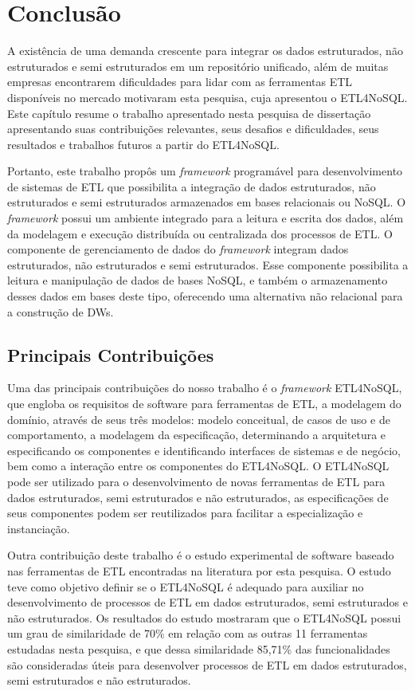 \chapter{Conclusão}


A existência de uma demanda crescente para integrar os dados estruturados, não estruturados e semi estruturados em um repositório unificado, além de muitas empresas encontrarem dificuldades para lidar com as ferramentas ETL disponíveis no mercado motivaram esta pesquisa, cuja apresentou o ETL4NoSQL. Este capítulo resume o trabalho apresentado nesta pesquisa de dissertação apresentando suas contribuições relevantes, seus desafios e dificuldades, seus resultados e trabalhos futuros a partir do ETL4NoSQL. 


Portanto, este trabalho propôs um \textit{framework} programável para desenvolvimento de sistemas de ETL que possibilita a integração de dados estruturados, não estruturados e semi estruturados armazenados em bases relacionais ou NoSQL. O \textit{framework} possui um ambiente integrado para a leitura e escrita dos dados, além da modelagem e execução distribuída ou centralizada dos processos de ETL. O componente de gerenciamento de dados do \textit{framework} integram dados estruturados, não estruturados e semi estruturados. Esse componente possibilita a leitura e manipulação de dados de bases NoSQL, e também o armazenamento desses dados em bases deste tipo, oferecendo uma alternativa não relacional para a construção de DWs.

\clearpage

\section{Principais Contribuições}

Uma das principais contribuições do nosso trabalho é o \textit{framework} ETL4NoSQL, que engloba os requisitos de software para ferramentas de ETL, a modelagem do domínio, através de seus três modelos: modelo conceitual, de casos de uso e de comportamento, a modelagem da especificação, determinando a arquitetura e especificando os componentes e identificando interfaces de sistemas e de negócio, bem como a interação entre os componentes do ETL4NoSQL. O ETL4NoSQL pode ser utilizado para o desenvolvimento de novas ferramentas de ETL para dados estruturados, semi estruturados e não estruturados, as especificações de seus componentes podem ser reutilizados para facilitar a especialização e instanciação.

Outra contribuição deste trabalho é o estudo experimental de software baseado nas ferramentas de ETL encontradas na literatura por esta pesquisa. O estudo teve como objetivo definir se o ETL4NoSQL é adequado para auxiliar no desenvolvimento de processos de ETL em dados estruturados, semi estruturados e não estruturados. Os resultados do estudo mostraram que o ETL4NoSQL possui um grau de similaridade de 70\% em relação com as outras 11 ferramentas estudadas nesta pesquisa, e que dessa similaridade 85,71\% das funcionalidades são consideradas úteis para desenvolver processos de ETL em dados estruturados, semi estruturados e não estruturados. 

